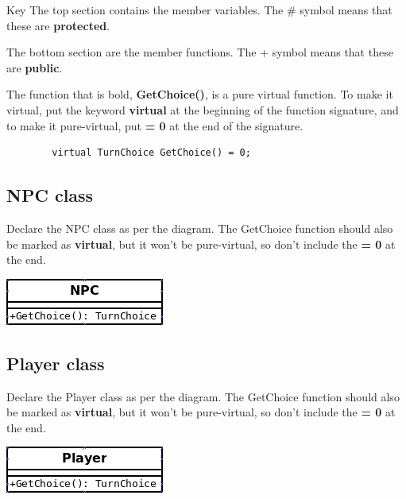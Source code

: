 \documentclass[a4paper,12pt,oneside]{book}
\begin{document}
    \begin{hint}{Key}
        The top section contains the member variables. The \# symbol
        means that these are \textbf{protected}.

        The bottom section are the member functions. The + symbol
        means that these are \textbf{public}.

        The function that is bold, \textbf{GetChoice()}, is a pure
        virtual function.
        To make it virtual, put the keyword \textbf{virtual}
        at the beginning of the function signature, and to make it
        pure-virtual, put \textbf{= 0} at the end of the signature.
        \begin{verbatim}
        virtual TurnChoice GetChoice() = 0;
        \end{verbatim}
    \end{hint}

    \subsection{NPC class}

    Declare the NPC class as per the diagram. The GetChoice function
    should also be marked as \textbf{virtual}, but it won't be pure-virtual,
    so don't include the \textbf{= 0} at the end.
    
    \begin{center}
        \includegraphics{images/lab9-npc.png}
    \end{center}

    \subsection{Player class}

    Declare the Player class as per the diagram. The GetChoice function
    should also be marked as \textbf{virtual}, but it won't be pure-virtual,
    so don't include the \textbf{= 0} at the end.
    
    \begin{center}
        \includegraphics{images/lab9-player.png}
    \end{center}
\end{document}

